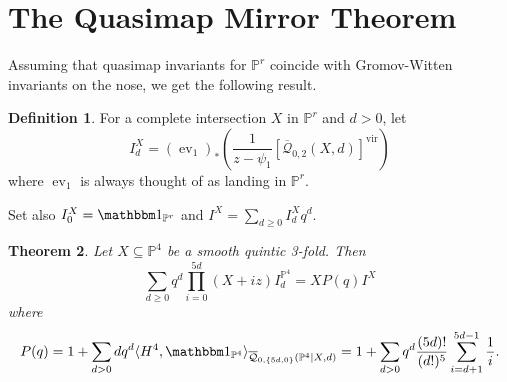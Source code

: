 \documentclass[11pt]{amsart}
\newcommand{\Q}[4]{\overline{\mathcal Q}_{#1,#2}(#3,#4)}
\newcommand{\PP}{\mathbb P}
\newcommand{\ev}{\operatorname{ev}}
\theoremstyle{plain}
\newtheorem{thm}{Theorem}[section]
\theoremstyle{definition}
\newtheorem{dfn}[thm]{Definition}
\begin{document}
\section{The Quasimap Mirror Theorem}
Assuming that quasimap invariants for $\PP^r$ coincide with Gromov-Witten invariants on the nose, we get the following result.
\begin{dfn}
 For a complete intersection $X$ in $\PP^r$ and $d>0$, let
 \[
  I^X_d=(\ev_1)_*\left(\frac{1}{z-\psi_1}[\Q{0}{2}{X}{d}]^\text{vir}\right)
 \]
 where $\ev_1$ is always thought of as landing in $\PP^r$.
 
 Set also $I^X_0=\mathbbm 1_{\PP^r}$ and $I^X=\sum_{d\geq 0}I^X_d q^d$.
\end{dfn}
\begin{thm}
Let $X\subseteq\PP^4$ be a smooth quintic 3-fold. Then
 \[
  \sum_{d\geq 0} q^d\prod_{i=0}^{5d}(X+iz)I^{\PP^4}_d= XP(q)I^X
 \]
where
\[
 P(q)=1+\sum_{d>0}dq^d\langle H^4,\mathbbm 1_{\PP^4}\rangle_{\Q{0}{\{5d,0\}}{\PP^4|X}{d}}=1+\sum_{d>0}q^d\frac{(5d)!}{(d!)^5}\sum_{i=d+1}^{5d-1}\frac{1}{i}.
\]
\end{thm}
\end{document}
